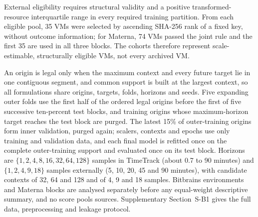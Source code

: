 \documentclass[5p,twocolumn]{elsarticle}
\begin{document}
External eligibility requires structural validity and a positive
transformed-resource interquartile range in every required training
partition. From each eligible pool, 35 VMs were selected by ascending SHA-256
rank of a fixed key, without outcome information; for Materna, 74 VMs passed
the joint rule and the first 35 are used in all three blocks. The cohorts
therefore represent scale-estimable, structurally eligible VMs, not every
archived VM.

An origin is legal only when the maximum context and every future target lie
in one contiguous segment, and common support is built at the largest
context, so all formulations share origins, targets, folds, horizons and
seeds. Five expanding outer folds use the first half of the ordered legal
origins before the first of five successive ten-percent test blocks, and
training origins whose maximum-horizon target reaches the test block are
purged. The latest 15\% of outer-training origins form inner validation,
purged again; scalers, contexts and epochs use only training and validation
data, and each final model is refitted once on the complete outer-training
support and evaluated once on its test block. Horizons are
$\{1,2,4,8,16,32,64,128\}$ samples in TimeTrack (about 0.7 to 90
minutes) and $\{1,2,4,9,18\}$ samples externally (5, 10, 20, 45 and 90
minutes), with candidate contexts of 32, 64 and 128 and of 4, 9 and 18
samples. Bitbrains environments and Materna blocks are analysed separately
before any equal-weight descriptive summary, and no score pools sources.
Supplementary Section~S-B1 gives the full data, preprocessing and leakage
protocol.
\end{document}
